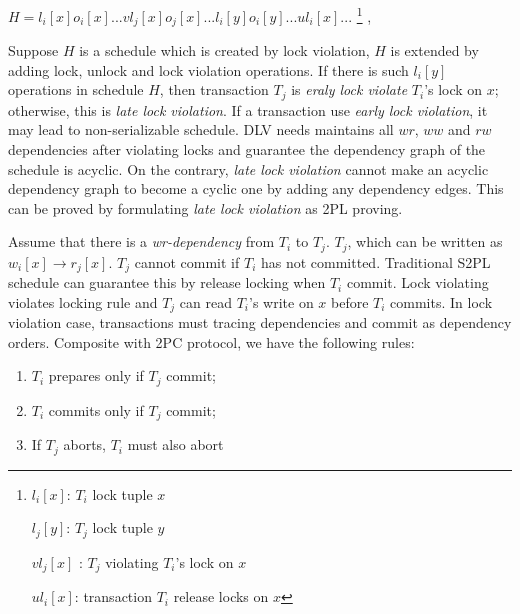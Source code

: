 \documentclass[conference]{IEEEtran}
\begin{document}
\begin{center}
  ${H = l_i[x] o_i[x]... vl_j[x] o_j[x]...  l_i[y] o_i[y]... ul_i[x] ... }$
\footnote{

  $l_i[x]$:   ${T_i}$ lock tuple ${x}$
    
  $l_j[y]$:  ${T_j}$ lock tuple ${y}$
  
 $vl_j[x]$ : ${T_j}$ violating  ${T_i}$'s lock on ${x}$
 
 $ul_i[x]$: transaction ${T_i}$ release locks on ${x}$
}  
  , 
    
\end{center}




Suppose ${H}$ is a schedule which is created by lock violation, ${H}$ is extended by adding lock, unlock and lock violation operations.
If there is such $l_i[y]$ operations in schedule ${H}$,
then transaction ${T_j}$ is \emph{eraly lock violate} ${T_i}$'s lock on ${x}$;
otherwise, this is \emph{late lock violation}.
If a transaction use \emph{early lock violation}, it may lead to non-serializable schedule.
DLV needs maintains all $wr$, $ww$ and $rw$ dependencies after violating locks and guarantee the dependency graph of the schedule is acyclic. 
On the contrary, \emph{late lock violation} cannot make an acyclic dependency graph to become a cyclic one by adding any dependency edges.
This can be proved by formulating \emph{late lock violation} as 2PL proving.

Assume that there is a \emph{wr-dependency} from ${T_i}$ to ${T_j}$.
    ${T_j}$, which can be written as ${w_i[x] \rightarrow r_j[x]}$.
${T_j}$ cannot commit if ${T_i}$ has not committed.
Traditional S2PL schedule can guarantee this by release locking when ${T_i}$ commit.
Lock violating violates locking rule and ${T_j}$ can read ${T_i}$'s write on ${x}$ before ${T_i}$ commits.
In lock violation case, transactions must tracing dependencies and commit as dependency orders. 
Composite with 2PC protocol, we have the following rules:

\begin{enumerate}
  \item ${T_i}$ prepares only if ${T_j}$ commit;
  \label{rule:prepare}

  \item  ${T_i}$ commits only if ${T_j}$ commit;
  \label{rule:commit} 
  
  \item If ${T_j}$ aborts, ${T_i}$ must also abort

  \label{rule:abort} 
    \end{enumerate}
\end{document}
